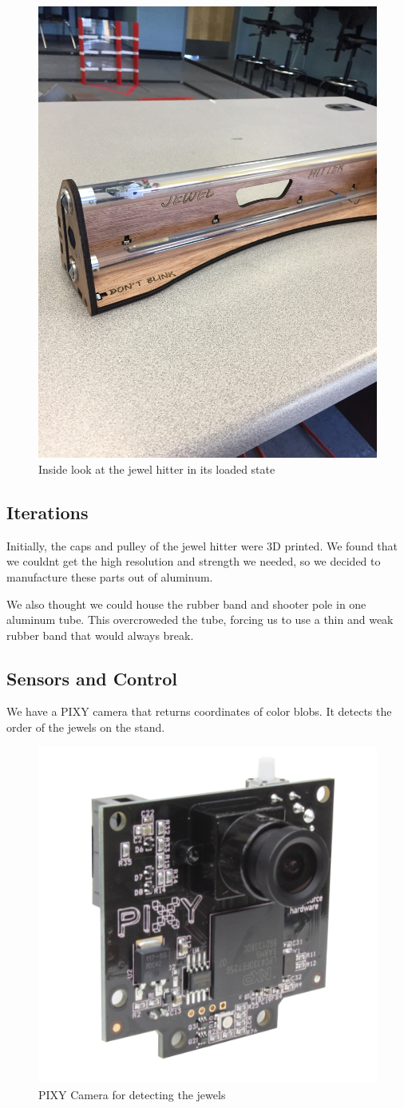 \begin{figure}[htp]
\centering
\includegraphics[width=.4\linewidth, angle =270]{Design_Overview/loaded_side_jewel.JPG}
\caption{Inside look at the jewel hitter in its loaded state}
\label{fig:inside}
\end{figure}



\subsection*{Iterations}
Initially, the caps and pulley of the jewel hitter were 3D printed. We found that we couldnt get the high resolution and strength we needed, so we decided to manufacture these parts out of aluminum. 

We also thought we could house the rubber band and shooter pole in one aluminum tube. This overcroweded the tube, forcing us to use a thin and weak rubber band that would always break. 

\subsection*{Sensors and Control} 
We have a PIXY camera that returns coordinates of color blobs. It detects the order of the jewels on the stand.

\begin{figure}[htp]
\centering
\includegraphics[width=.5\linewidth]{Design_Overview/pixy_camera.jpg}
\caption{PIXY Camera for detecting the jewels}
\label{fig:pixy_cam}
\end{figure}